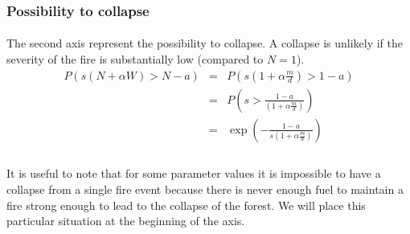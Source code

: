 \documentclass{article}
\begin{document}
\subsubsection{Possibility to collapse}


\paragraph{}
The second axis represent the possibility to collapse. A collapse is unlikely if the severity of the fire is substantially low (compared to $N = 1$). %
\[
\begin{array}{rccl}
P(s(N+\alpha W) > N-a ) & = & P(s(1+\alpha \frac{m}{d}) > 1-a ) \\
& = & P(s > \frac{1-a}{(1+\alpha \frac{m}{d})} ) \\
& = & \exp(-\frac{1-a}{s(1+\alpha\frac{m}{d})}) \\ 
\end{array}
\]


\paragraph{}
It is useful to note that for some  parameter values it is impossible to have a collapse from a single fire event because there is never enough fuel to maintain a fire strong enough to lead to the collapse of the forest. We will place this particular situation at the beginning of the axis.

\end{document}
